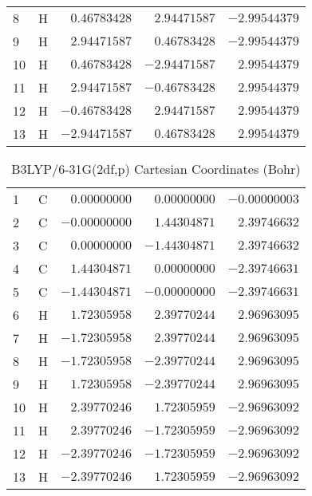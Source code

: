 \documentclass[10pt,oneside]{article}
\begin{document}
\begin{table}[h!]
\begin{multicols}{2}
\begin{tabular}{llrrr}
8  & H  & $ 0.46783428$ & $ 2.94471587$ & $-2.99544379$ \\
9  & H  & $ 2.94471587$ & $ 0.46783428$ & $-2.99544379$ \\
10 & H  & $ 0.46783428$ & $-2.94471587$ & $ 2.99544379$ \\
11 & H  & $ 2.94471587$ & $-0.46783428$ & $ 2.99544379$ \\
12 & H  & $-0.46783428$ & $ 2.94471587$ & $ 2.99544379$ \\
13 & H  & $-2.94471587$ & $ 0.46783428$ & $ 2.99544379$ \\
\bottomrule
\end{tabular}
\end{multicols}
\end{table}

\begin{table}[h]
\centering
\caption{B3LYP/6-31G(2df,p) Cartesian Coordinates (Bohr)}
\begin{tabular}{llrrr}
\toprule
1  & C  & $ 0.00000000$ & $ 0.00000000$ & $-0.00000003$ \\
2  & C  & $-0.00000000$ & $ 1.44304871$ & $ 2.39746632$ \\
3  & C  & $ 0.00000000$ & $-1.44304871$ & $ 2.39746632$ \\
4  & C  & $ 1.44304871$ & $ 0.00000000$ & $-2.39746631$ \\
5  & C  & $-1.44304871$ & $-0.00000000$ & $-2.39746631$ \\
6  & H  & $ 1.72305958$ & $ 2.39770244$ & $ 2.96963095$ \\
7  & H  & $-1.72305958$ & $ 2.39770244$ & $ 2.96963095$ \\
8  & H  & $-1.72305958$ & $-2.39770244$ & $ 2.96963095$ \\
9  & H  & $ 1.72305958$ & $-2.39770244$ & $ 2.96963095$ \\
10 & H  & $ 2.39770246$ & $ 1.72305959$ & $-2.96963092$ \\
11 & H  & $ 2.39770246$ & $-1.72305959$ & $-2.96963092$ \\
12 & H  & $-2.39770246$ & $-1.72305959$ & $-2.96963092$ \\
13 & H  & $-2.39770246$ & $ 1.72305959$ & $-2.96963092$ \\
\bottomrule
\end{tabular}
\end{table}
\end{document}
